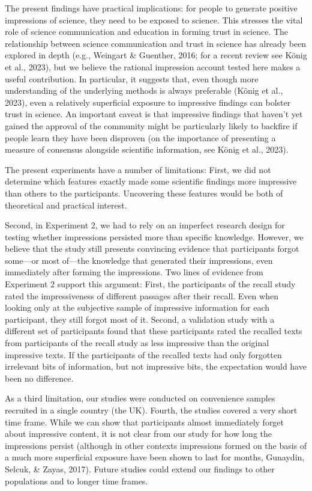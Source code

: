 \documentclass[
  english,
  doc,floatsintext]{apa6}
\begin{document}
The present findings have practical implications: for people to generate positive impressions of science, they need to be exposed to science. This stresses the vital role of science communication and education in forming trust in science. The relationship between science communication and trust in science has already been explored in depth (e.g., Weingart \& Guenther, 2016; for a recent review see König et al., 2023), but we believe the rational impression account tested here makes a useful contribution. In particular, it suggests that, even though more understanding of the underlying methods is always preferable (König et al., 2023), even a relatively superficial exposure to impressive findings can bolster trust in science. An important caveat is that impressive findings that haven't yet gained the approval of the community might be particularly likely to backfire if people learn they have been disproven (on the importance of presenting a measure of consensus alongside scientific information, see König et al., 2023).

The present experiments have a number of limitations: First, we did not determine which features exactly made some scientific findings more impressive than others to the participants. Uncovering these features would be both of theoretical and practical interest.

Second, in Experiment 2, we had to rely on an imperfect research design for testing whether impressions persisted more than specific knowledge. However, we believe that the study still presents convincing evidence that participants forgot some---or most of---the knowledge that generated their impressions, even immediately after forming the impressions. Two lines of evidence from Experiment 2 support this argument: First, the participants of the recall study rated the impressiveness of different passages after their recall. Even when looking only at the subjective sample of impressive information for each participant, they still forgot most of it. Second, a validation study with a different set of participants found that these participants rated the recalled texts from participants of the recall study as less impressive than the original impressive texts. If the participants of the recalled texts had only forgotten irrelevant bits of information, but not impressive bits, the expectation would have been no difference.

As a third limitation, our studies were conducted on convenience samples recruited in a single country (the UK). Fourth, the studies covered a very short time frame. While we can show that participants almost immediately forget about impressive content, it is not clear from our study for how long the impressions persist (although in other contexts impressions formed on the basis of a much more superficial exposure have been shown to last for months, Gunaydin, Selcuk, \& Zayas, 2017). Future studies could extend our findings to other populations and to longer time frames.
\end{document}
